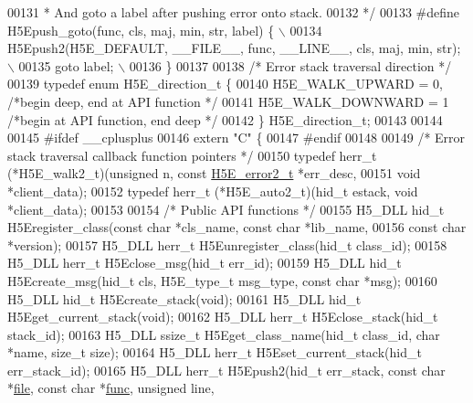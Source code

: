 \begin{DoxyCode}
00131 \textcolor{comment}{ * And goto a label after pushing error onto stack.}
00132 \textcolor{comment}{ */}
00133 \textcolor{preprocessor}{#define H5Epush\_goto(func, cls, maj, min, str, label) \{               \(\backslash\)}
00134 \textcolor{preprocessor}{    H5Epush2(H5E\_DEFAULT, \_\_FILE\_\_, func, \_\_LINE\_\_, cls, maj, min, str);      \(\backslash\)}
00135 \textcolor{preprocessor}{    goto label;                                   \(\backslash\)}
00136 \textcolor{preprocessor}{\}}
00137 
00138 \textcolor{comment}{/* Error stack traversal direction */}
00139 \textcolor{keyword}{typedef} \textcolor{keyword}{enum} H5E\_direction\_t \{
00140     H5E\_WALK\_UPWARD = 0,        \textcolor{comment}{/*begin deep, end at API function    */}
00141     H5E\_WALK\_DOWNWARD   = 1     \textcolor{comment}{/*begin at API function, end deep    */}
00142 \} H5E\_direction\_t;
00143 
00144 
00145 \textcolor{preprocessor}{#ifdef \_\_cplusplus}
00146 \textcolor{keyword}{extern} \textcolor{stringliteral}{"C"} \{
00147 \textcolor{preprocessor}{#endif}
00148 
00149 \textcolor{comment}{/* Error stack traversal callback function pointers */}
00150 \textcolor{keyword}{typedef} herr\_t (*H5E\_walk2\_t)(\textcolor{keywordtype}{unsigned} n, \textcolor{keyword}{const} \hyperlink{struct_h5_e__error2__t}{H5E\_error2\_t} *err\_desc,
00151     \textcolor{keywordtype}{void} *client\_data);
00152 \textcolor{keyword}{typedef} herr\_t (*H5E\_auto2\_t)(hid\_t estack, \textcolor{keywordtype}{void} *client\_data);
00153 
00154 \textcolor{comment}{/* Public API functions */}
00155 H5\_DLL hid\_t  H5Eregister\_class(\textcolor{keyword}{const} \textcolor{keywordtype}{char} *cls\_name, \textcolor{keyword}{const} \textcolor{keywordtype}{char} *lib\_name,
00156     \textcolor{keyword}{const} \textcolor{keywordtype}{char} *version);
00157 H5\_DLL herr\_t H5Eunregister\_class(hid\_t class\_id);
00158 H5\_DLL herr\_t H5Eclose\_msg(hid\_t err\_id);
00159 H5\_DLL hid\_t  H5Ecreate\_msg(hid\_t cls, H5E\_type\_t msg\_type, \textcolor{keyword}{const} \textcolor{keywordtype}{char} *msg);
00160 H5\_DLL hid\_t  H5Ecreate\_stack(\textcolor{keywordtype}{void});
00161 H5\_DLL hid\_t  H5Eget\_current\_stack(\textcolor{keywordtype}{void});
00162 H5\_DLL herr\_t H5Eclose\_stack(hid\_t stack\_id);
00163 H5\_DLL ssize\_t H5Eget\_class\_name(hid\_t class\_id, \textcolor{keywordtype}{char} *name, \textcolor{keywordtype}{size\_t} size);
00164 H5\_DLL herr\_t H5Eset\_current\_stack(hid\_t err\_stack\_id);
00165 H5\_DLL herr\_t H5Epush2(hid\_t err\_stack, \textcolor{keyword}{const} \textcolor{keywordtype}{char} *\hyperlink{structfile}{file}, \textcolor{keyword}{const} \textcolor{keywordtype}{char} *\hyperlink{structfunc}{func}, \textcolor{keywordtype}{unsigned} line,

\end{DoxyCode}

